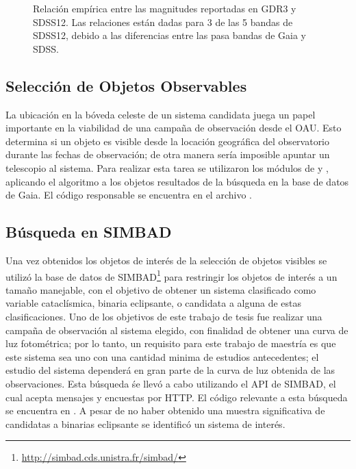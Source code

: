 \begin{figure}[!ht]
	\caption{Relación empírica entre las magnitudes reportadas en GDR3 y SDSS12. Las relaciones están dadas para 3 de las 5 bandas de SDSS12, debido a las diferencias entre las pasa bandas de Gaia y SDSS. \citet{gdr3ReleaseDocumentation}}
	\label{gdr3SdssConversionGraphs}
\end{figure}

\subsection{Selección de Objetos Observables} \label{muestra:crit_seleccion:objetos_observables}

La ubicación en la bóveda celeste de un sistema candidata juega un papel
importante en la viabilidad de una campaña de observación desde el OAU. Esto
determina si un objeto es visible desde la locación geográfica del observatorio
durante las fechas de observación; de otra manera sería imposible apuntar un
telescopio al sistema. Para realizar esta tarea se utilizaron los módulos de
 \citet{astroplan} y  \citet{astropy}, aplicando
el algoritmo a los objetos resultados de la búsqueda en la base de datos de
Gaia. El código responsable se encuentra en el archivo
\href{https://github.com/KnightIV/UANL_MAPTA_Observaciones/blob/main/obsrv_plan/gaia/observable_targets.py}{}.


\subsection{Búsqueda en SIMBAD} \label{muestra:crit_seleccion:busqueda_simbad}

Una vez obtenidos los objetos de interés de la selección de objetos visibles se
utilizó la base de datos de
SIMBAD\footnote{\url{http://simbad.cds.unistra.fr/simbad/}}
\citet{simbadDatabase} para restringir los objetos de interés a un tamaño
manejable, con el objetivo de obtener un sistema clasificado como variable
cataclísmica, binaria eclipsante, o candidata a alguna de estas clasificaciones.
Uno de los objetivos de este trabajo de tesis fue realizar una campaña de
observación al sistema elegido, con finalidad de obtener una curva de luz
fotométrica; por lo tanto, un requisito para este trabajo de maestría es que
este sistema sea uno con una cantidad minima de estudios antecedentes; el
estudio del sistema dependerá en gran parte de la curva de luz obtenida de las
observaciones. Esta búsqueda śe llevó a cabo utilizando el API de SIMBAD, el
cual acepta mensajes y encuestas por HTTP. El código relevante a esta búsqueda
se encuentra en
\href{https://github.com/KnightIV/UANL_MAPTA_Observaciones/blob/main/obsrv_plan/simbad/retrieve_vots.py}{}.
A pesar de no haber obtenido una muestra significativa de candidatas a binarias
eclipsante se identificó un sistema de interés.

